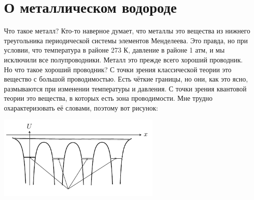 \section{О металлическом водороде}

Что такое металл? Кто-то наверное думает, что металлы это вещества из нижнего треугольника периодической системы элементов Менделеева. Это правда, но при условии, что температура в районе 273 К, давление в районе 1 атм, и мы исключили все полупроводники. Металл это прежде всего хороший проводник. Но что такое хороший проводник? С точки зрения классической теории это вещество с большой проводимостью. Есть чёткие границы, но они, как это ясно, размываются при изменении температуры и давления. С точки зрения квантовой теории это вещества, в которых есть зона проводимости. Мне трудно охарактеризовать её словами, поэтому вот рисунок:
\begin{center}
	\includegraphics[width = 0.6\textwidth]{images/tikz/for_H_metall}
\end{center}